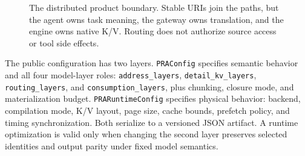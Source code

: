 \documentclass[11pt]{article}
\begin{document}
\begin{figure}[H]
\centering
{}
\caption{The distributed product boundary. Stable URIs join the paths, but the
agent owns task meaning, the gateway owns translation, and the engine owns
native K/V. Routing does not authorize source access or tool side effects.}
\label{fig:architecture}
\end{figure}

The public configuration has two layers.  \texttt{PRAConfig} specifies
semantic behavior and all four model-layer roles: \texttt{address\_layers},
\texttt{detail\_kv\_layers}, \texttt{routing\_layers}, and
\texttt{consumption\_layers}, plus chunking, closure mode, and materialization
budget. \texttt{PRARuntimeConfig} specifies physical behavior:
backend, compilation mode, K/V layout, page size, cache bounds, prefetch policy,
and timing synchronization.  Both serialize to a versioned JSON artifact.  A
runtime optimization is valid only when changing the second layer preserves
selected identities and output parity under fixed model semantics.
\end{document}
